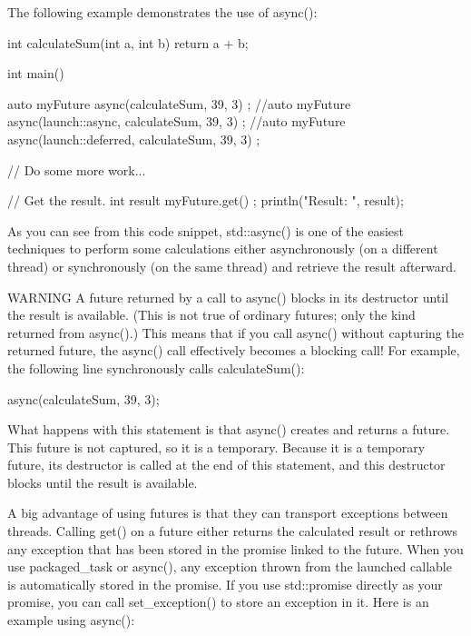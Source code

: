 The following example demonstrates the use of async():

\begin{cpp}
int calculateSum(int a, int b) { return a + b; }

int main()
{
    auto myFuture { async(calculateSum, 39, 3) };
    //auto myFuture { async(launch::async, calculateSum, 39, 3) };
    //auto myFuture { async(launch::deferred, calculateSum, 39, 3) };

    // Do some more work...

    // Get the result.
    int result { myFuture.get() };
    println("Result: {}", result);
}
\end{cpp}

As you can see from this code snippet, std::async() is one of the easiest techniques to perform some calculations either asynchronously (on a different thread) or synchronously (on the same thread) and retrieve the result afterward.

\begin{myWarning}{WARNING}
A future returned by a call to async() blocks in its destructor until the result is available. (This is not true of ordinary futures; only the kind returned from async().) This means that if you call async() without capturing the returned future, the async() call effectively becomes a blocking call! For example, the following line synchronously calls calculateSum():

\begin{cpp}
async(calculateSum, 39, 3);
\end{cpp}

What happens with this statement is that async() creates and returns a future. This future is not captured, so it is a temporary. Because it is a temporary future, its destructor is called at the end of this statement, and this destructor blocks until the result is available.
\end{myWarning}


A big advantage of using futures is that they can transport exceptions between threads. Calling get() on a future either returns the calculated result or rethrows any exception that has been stored in the promise linked to the future. When you use packaged\_task or async(), any exception thrown from the launched callable is automatically stored in the promise. If you use std::promise directly as your promise, you can call set\_exception() to store an exception in it. Here is an example using async():


